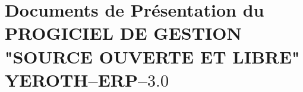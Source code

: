 \chapter{Documents de Pr\'esentation du PROGICIEL DE GESTION "SOURCE OUVERTE ET LIBRE" YEROTH--ERP--$3.0$}

\newpage
